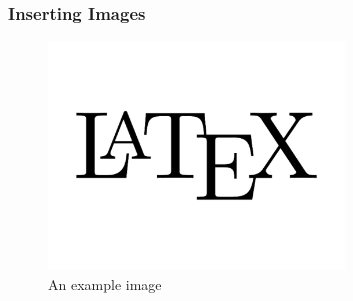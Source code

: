 \begin{frame}
    \frametitle{Inserting Images}
    \begin{figure}
        \centering
        \includegraphics[width=0.7\textwidth]{figures/example}
        \caption{An example image} 
    \end{figure}
\end{frame}
